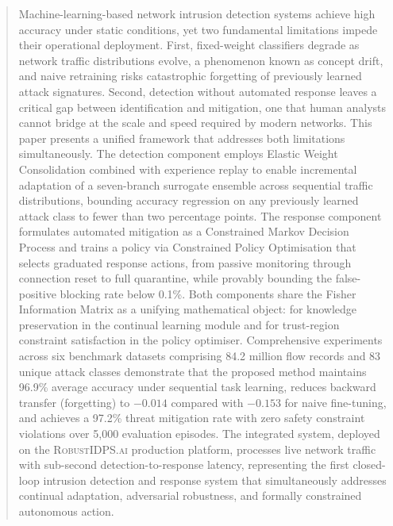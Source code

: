 \documentclass[journal]{IEEEtran}
\theoremstyle{definition}
\theoremstyle{remark}
\newcommand{\RobustIDPS}{\textsc{RobustIDPS.ai}}
\begin{document}
\begin{abstract}
Machine-learning-based network intrusion detection systems achieve high accuracy under static conditions, yet two fundamental limitations impede their operational deployment. First, fixed-weight classifiers degrade as network traffic distributions evolve, a phenomenon known as concept drift, and naive retraining risks catastrophic forgetting of previously learned attack signatures. Second, detection without automated response leaves a critical gap between identification and mitigation, one that human analysts cannot bridge at the scale and speed required by modern networks. This paper presents a unified framework that addresses both limitations simultaneously. The detection component employs Elastic Weight Consolidation combined with experience replay to enable incremental adaptation of a seven-branch surrogate ensemble across sequential traffic distributions, bounding accuracy regression on any previously learned attack class to fewer than two percentage points. The response component formulates automated mitigation as a Constrained Markov Decision Process and trains a policy via Constrained Policy Optimisation that selects graduated response actions, from passive monitoring through connection reset to full quarantine, while provably bounding the false-positive blocking rate below 0.1\%. Both components share the Fisher Information Matrix as a unifying mathematical object: for knowledge preservation in the continual learning module and for trust-region constraint satisfaction in the policy optimiser. Comprehensive experiments across six benchmark datasets comprising 84.2 million flow records and 83 unique attack classes demonstrate that the proposed method maintains 96.9\% average accuracy under sequential task learning, reduces backward transfer (forgetting) to $-0.014$ compared with $-0.153$ for naive fine-tuning, and achieves a 97.2\% threat mitigation rate with zero safety constraint violations over 5{,}000 evaluation episodes. The integrated system, deployed on the \RobustIDPS{} production platform, processes live network traffic with sub-second detection-to-response latency, representing the first closed-loop intrusion detection and response system that simultaneously addresses continual adaptation, adversarial robustness, and formally constrained autonomous action.
\end{abstract}
\end{document}
